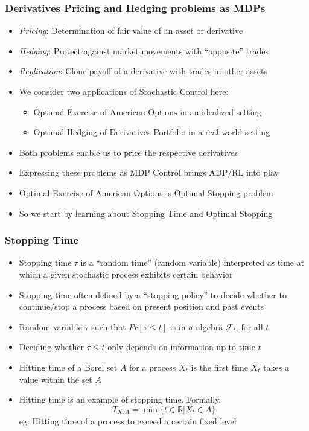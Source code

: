 \documentclass[handout]{beamer}
\begin{document}
\begin{frame}
\frametitle{Derivatives Pricing and Hedging problems as MDPs}
\pause
\begin{itemize}[<+->]
\item {\em Pricing}: Determination of fair value of an asset or derivative
\item {\em Hedging}: Protect against market movements with ``opposite'' trades
\item {\em Replication}: Clone payoff of a derivative with trades in other assets
\item We consider two applications of Stochastic Control here:
\begin{itemize}[<+->]
\item Optimal Exercise of American Options in an idealized setting
\item Optimal Hedging of Derivatives Portfolio in a real-world setting
\end{itemize}
\item Both problems enable us to price the respective derivatives
\item Expressing these problems as MDP Control brings ADP/RL into play
\item Optimal Exercise of American Options is Optimal Stopping problem
\item So we start by learning about Stopping Time and Optimal Stopping
\end{itemize}
\end{frame}

\begin{frame}
\frametitle{Stopping Time}
\pause
\begin{itemize}[<+->]
\item Stopping time $\tau$ is a ``random time'' (random variable) interpreted as time at which a given stochastic process exhibits certain behavior
\item Stopping time often defined by a ``stopping policy'' to decide whether to continue/stop a process based on present position and past events
\item Random variable $\tau$ such that $Pr[\tau \leq t]$ is in $\sigma$-algebra $\mathcal{F}_t$, for all $t$
\item Deciding whether $\tau \leq t$ only depends on information up to time $t$
\item Hitting time of a Borel set $A$ for a process $X_t$ is the first time $X_t$ takes a value within the set $A$
\item Hitting time is an example of stopping time. Formally, 
$$T_{X,A} = \min \{t \in \mathbb{R} | X_t \in A\}$$
eg: Hitting time of a process to exceed a certain fixed level
\end{itemize}
\end{frame}
\end{document}

